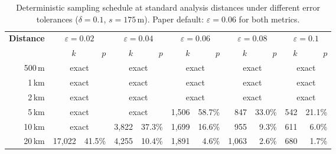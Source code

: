 \begin{table}[htbp]
\centering
\caption{Deterministic sampling schedule at standard analysis distances under different
  error tolerances ($\delta = 0.1$, $s = 175\,$m).
  Paper default: $\varepsilon=0.06$ for both metrics.}
\label{tab:ew_comparison}
\small
\begin{tabular}{@{}rrrrrrrrrrr@{}}
\toprule
\textbf{Distance} & \multicolumn{2}{c}{$\varepsilon=0.02$} & \multicolumn{2}{c}{$\varepsilon=0.04$} & \multicolumn{2}{c}{$\varepsilon=0.06$} & \multicolumn{2}{c}{$\varepsilon=0.08$} & \multicolumn{2}{c}{$\varepsilon=0.1$} \\
          & $k$ & $p$ & $k$ & $p$ & $k$ & $p$ & $k$ & $p$ & $k$ & $p$ \\
\midrule
500\,m & \multicolumn{2}{c}{exact} & \multicolumn{2}{c}{exact} & \multicolumn{2}{c}{exact} & \multicolumn{2}{c}{exact} & \multicolumn{2}{c}{exact} \\
1\,km & \multicolumn{2}{c}{exact} & \multicolumn{2}{c}{exact} & \multicolumn{2}{c}{exact} & \multicolumn{2}{c}{exact} & \multicolumn{2}{c}{exact} \\
2\,km & \multicolumn{2}{c}{exact} & \multicolumn{2}{c}{exact} & \multicolumn{2}{c}{exact} & \multicolumn{2}{c}{exact} & \multicolumn{2}{c}{exact} \\
5\,km & \multicolumn{2}{c}{exact} & \multicolumn{2}{c}{exact} & 1{,}506 & 58.7\% & 847 & 33.0\% & 542 & 21.1\% \\
10\,km & \multicolumn{2}{c}{exact} & 3{,}822 & 37.3\% & 1{,}699 & 16.6\% & 955 & 9.3\% & 611 & 6.0\% \\
20\,km & 17{,}022 & 41.5\% & 4{,}255 & 10.4\% & 1{,}891 & 4.6\% & 1{,}063 & 2.6\% & 680 & 1.7\% \\
\bottomrule
\end{tabular}
\end{table}
